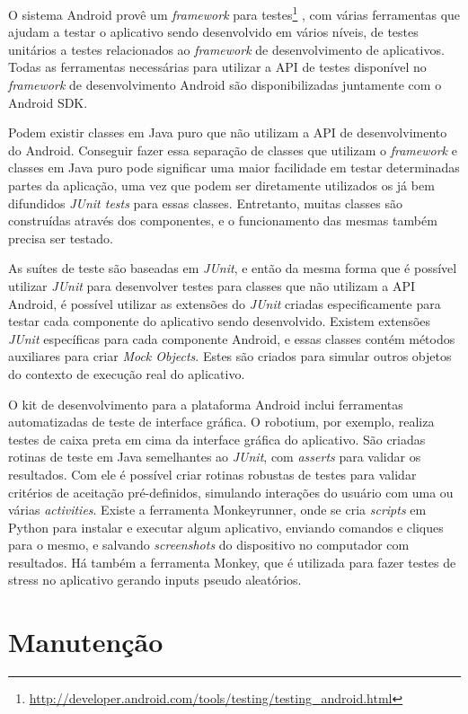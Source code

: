 O sistema Android provê um \textit{framework} para testes\footnote{\url{http://developer.android.com/tools/testing/testing\_android.html}} , com várias ferramentas que ajudam a testar o aplicativo sendo desenvolvido em vários níveis, de testes unitários a testes relacionados ao \textit{framework} de desenvolvimento de aplicativos. Todas as ferramentas necessárias para utilizar a API de testes disponível no \textit{framework} de desenvolvimento Android são disponibilizadas juntamente com o Android SDK.

Podem existir classes em Java puro que não utilizam a API de desenvolvimento do Android. Conseguir fazer essa separação de classes que utilizam o \textit{framework} e classes em Java puro pode significar uma maior facilidade em testar determinadas partes da aplicação, uma vez que podem ser diretamente utilizados os já bem difundidos \textit{JUnit tests} para essas classes. Entretanto, muitas classes são construídas através dos componentes, e o funcionamento das mesmas também precisa ser testado.

As suítes de teste são baseadas em \textit{JUnit}, e então da mesma forma que é possível utilizar \textit{JUnit} para desenvolver testes para classes que não utilizam a API Android, é possível utilizar as extensões do \textit{JUnit} criadas especificamente para testar cada componente do aplicativo sendo desenvolvido. Existem extensões \textit{JUnit} específicas para cada componente Android, e essas classes contém métodos auxiliares para criar \textit{Mock Objects}. Estes são criados para simular outros objetos do contexto de execução real do aplicativo.

O kit de desenvolvimento para a plataforma Android inclui ferramentas automatizadas de teste de interface gráfica. O robotium, por exemplo, realiza testes de caixa preta em cima da interface gráfica do aplicativo. São criadas rotinas de teste em Java semelhantes ao \textit{JUnit}, com \textit{asserts} para validar os resultados. Com ele é possível criar rotinas robustas de testes para validar critérios de aceitação pré-definidos, simulando interações do usuário com uma ou várias \textit{activities}. Existe a ferramenta Monkeyrunner, onde se cria \textit{scripts} em Python para instalar e executar algum aplicativo, enviando comandos e cliques para o mesmo, e salvando \textit{screenshots} do dispositivo no computador com resultados. Há também a ferramenta Monkey, que é utilizada para fazer testes de stress no aplicativo gerando inputs pseudo aleatórios.

\section{Manutenção}

